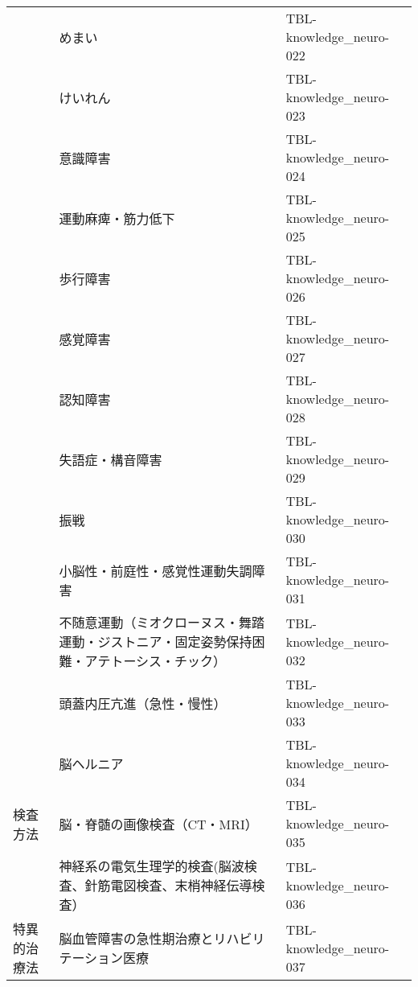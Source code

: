 \begin{xltabular}{\linewidth}{XXX}
 & めまい & TBL-knowledge_neuro-022 \\
 & けいれん & TBL-knowledge_neuro-023 \\
 & 意識障害 & TBL-knowledge_neuro-024 \\
 & 運動麻痺・筋力低下 & TBL-knowledge_neuro-025 \\
 & 歩行障害 & TBL-knowledge_neuro-026 \\
 & 感覚障害 & TBL-knowledge_neuro-027 \\
 & 認知障害 & TBL-knowledge_neuro-028 \\
 & 失語症・構音障害 & TBL-knowledge_neuro-029 \\
 & 振戦 & TBL-knowledge_neuro-030 \\
 & 小脳性・前庭性・感覚性運動失調障害 & TBL-knowledge_neuro-031 \\
 & 不随意運動（ミオクローヌス・舞踏運動・ジストニア・固定姿勢保持困難・アテトーシス・チック） & TBL-knowledge_neuro-032 \\
 & 頭蓋内圧亢進（急性・慢性） & TBL-knowledge_neuro-033 \\
 & 脳ヘルニア & TBL-knowledge_neuro-034 \\
検査方法 & 脳・脊髄の画像検査（CT・MRI） & TBL-knowledge_neuro-035 \\
 & 神経系の電気生理学的検査(脳波検査、針筋電図検査、末梢神経伝導検査） & TBL-knowledge_neuro-036 \\
特異的治療法 & 脳血管障害の急性期治療とリハビリテーション医療 & TBL-knowledge_neuro-037 \\
\bottomrule
\end{xltabular}


